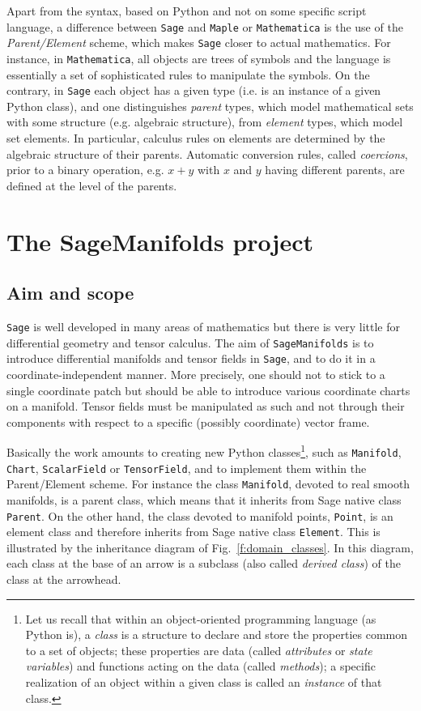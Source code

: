\documentclass[a4paper]{jpconf}
\newcommand{\soft}[1]{\texttt{#1}}
\newcommand{\code}[1]{\texttt{#1}}
\newcommand{\Sage}{\soft{Sage}}
\newcommand{\SM}{\soft{SageManifolds}}
\begin{document}
Apart from the syntax, based on Python and not on some specific script 
language, a difference between \Sage{} and \soft{Maple} or \soft{Mathematica}
is the use of the \emph{Parent/Element} scheme, which makes \Sage{} closer to 
actual mathematics. For instance, in \soft{Mathematica}, all objects 
are trees of symbols and the language is essentially a set of 
sophisticated rules to manipulate the symbols. On the contrary, in \Sage{}
each object has a given type (i.e. is an instance of a given Python class), 
and one distinguishes \emph{parent} types, which model mathematical
sets with some structure (e.g. algebraic structure), from \emph{element} types,
which model set elements. 
In particular, calculus rules on elements are determined by the algebraic
structure of their parents. Automatic conversion rules, called \emph{coercions},
prior to a binary operation, e.g. $x+y$ with $x$ and $y$ having different 
parents, are defined at the level of the parents.

\section{The SageManifolds project}

\subsection{Aim and scope}

\Sage{} is well developed in many areas of mathematics but there is
very little for differential geometry and tensor calculus.
The aim of \SM{} is to introduce differential manifolds and tensor fields
in \Sage{}, and to do it in a coordinate-independent manner. 
More precisely, one should not to stick to a single coordinate patch
but should be able to introduce various coordinate charts
on a manifold. Tensor fields must be manipulated as such and not through 
their components with respect to a specific (possibly coordinate) vector frame. 

Basically the work amounts to creating new Python classes\footnote{Let us
recall that within an object-oriented programming language (as Python is),
a \emph{class} is a structure to declare and store the
properties common to a set of objects; these properties 
are data (called 
\emph{attributes} or \emph{state variables}) and functions acting 
on the data (called \emph{methods}); a specific realization of an object 
within a given class is called an \emph{instance} of that class.},
 such as 
\code{Manifold}, \code{Chart}, \code{ScalarField} or \code{TensorField},
and to implement them within the Parent/Element scheme. 
For instance the class \code{Manifold}, devoted to real smooth manifolds,
is a parent class, which means that it inherits from Sage native class \code{Parent}.
On the other hand, the class devoted to manifold points, \code{Point}, 
is an element class and therefore inherits from Sage native class 
\code{Element}.
This is illustrated by the inheritance diagram of Fig.~\ref{f:domain_classes}.
In this diagram, each class at the base of an arrow is a subclass (also
called \emph{derived class}) of the class at the arrowhead.
\end{document}
